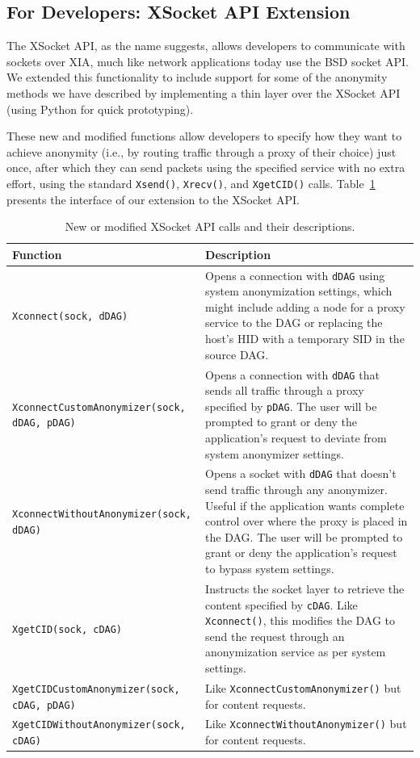 \documentclass{article}
\begin{document}
\subsection{For Developers: XSocket API Extension}
\label{api}
The XSocket API, as the name suggests, allows developers to communicate with sockets over XIA, much like network applications today use the BSD socket API. We extended this functionality to include support for some of the anonymity methods we have described by implementing a thin layer over the XSocket API (using Python for quick prototyping).

These new and modified functions allow developers to specify how they want to achieve anonymity (i.e., by routing traffic through a proxy of their choice) just once, after which they can send packets using the specified service with no extra effort, using the standard \texttt{Xsend()}, \texttt{Xrecv()}, and \texttt{XgetCID()} calls. Table~\ref{table:api-extension} presents the interface of our extension to the XSocket API.

\begin{table}
\centering
	\begin{tabular}{l p{7.5cm}}
	\textbf{Function} 	&	\textbf{Description}\\
	\hline
	\texttt{Xconnect(sock, dDAG)} & Opens a connection with \texttt{dDAG} using system anonymization settings, which might include adding a node for a proxy service to the DAG or replacing the host's HID with a temporary SID in the source DAG.\\
	\texttt{XconnectCustomAnonymizer(sock, dDAG, pDAG)} & Opens a connection with \texttt{dDAG} that sends all traffic through a proxy specified by \texttt{pDAG}. The user will be prompted to grant or deny the application's request to deviate from system anonymizer settings.\\
	\texttt{XconnectWithoutAnonymizer(sock, dDAG)} & Opens a socket with \texttt{dDAG} that doesn't send traffic through any anonymizer. Useful if the application wants complete control over where the proxy is placed in the DAG. The user will be prompted to grant or deny the application's request to bypass system settings.\\
	\texttt{XgetCID(sock, cDAG)} & Instructs the socket layer to retrieve the content specified by \texttt{cDAG}. Like \texttt{Xconnect()}, this modifies the DAG to send the request through an anonymization service as per system settings.\\
	\texttt{XgetCIDCustomAnonymizer(sock, cDAG, pDAG)} & Like \texttt{XconnectCustomAnonymizer()} but for content requests.\\
	\texttt{XgetCIDWithoutAnonymizer(sock, cDAG)} & Like \texttt{XconnectWithoutAnonymizer()} but for content requests.\\
	\hline
	\end{tabular}
	\caption{New or modified XSocket API calls and their descriptions.}
	\label{table:api-extension}
\end{table}
\end{document}
